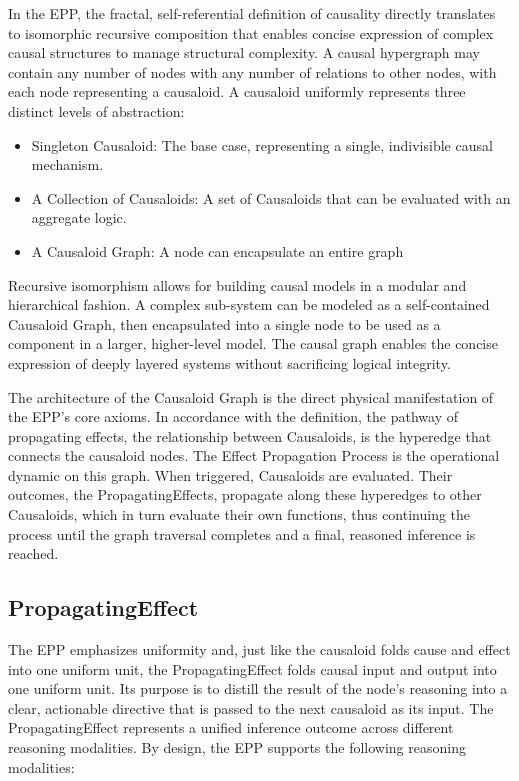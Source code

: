 In the EPP, the fractal, self-referential definition of causality directly translates 
to isomorphic recursive composition that enables concise expression of complex causal structures to manage structural complexity. A causal hypergraph may contain any number of nodes with any number of relations to other nodes, with each node representing a causaloid. A causaloid uniformly represents three distinct levels of abstraction:

\begin{itemize}
 	\item Singleton Causaloid: The base case, representing a single, indivisible causal mechanism.
 	\item A Collection of Causaloids: A set of Causaloids that can be evaluated with an aggregate logic. 
 	\item A Causaloid Graph: A node can encapsulate an entire graph
\end{itemize}

Recursive isomorphism allows for building causal models in a modular and hierarchical fashion. 
A complex sub-system can be modeled as a self-contained Causaloid Graph, then encapsulated into a single node to be used as a component in a larger, higher-level model. The causal graph enables the concise expression of deeply layered systems without sacrificing logical integrity.

The architecture of the Causaloid Graph is the direct physical manifestation of the EPP's core axioms. In accordance with the definition, the pathway of propagating effects, the relationship between Causaloids, is the hyperedge that connects the causaloid nodes. The Effect Propagation Process is the operational dynamic on this graph. When triggered, Causaloids are evaluated. Their outcomes, the PropagatingEffects, propagate along these hyperedges to other Causaloids, which in turn evaluate their own functions, thus continuing the process until the graph traversal completes and a final, reasoned inference is reached.

%
%
\subsection{PropagatingEffect}
\label{sec:propagating_effect}

The EPP emphasizes uniformity and, just like the causaloid folds cause and effect into one uniform unit, the PropagatingEffect folds causal input and output into one uniform unit. Its purpose is to distill the result of the node's reasoning into a clear, actionable directive that is passed to the next causaloid as its input. The PropagatingEffect represents a unified inference outcome across different reasoning modalities. By design, the EPP supports the following reasoning modalities:

